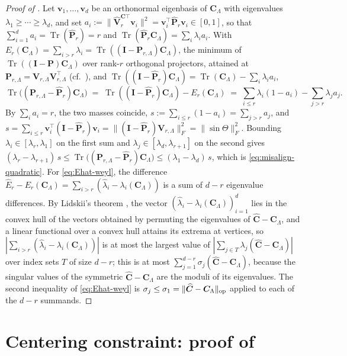 \documentclass[review,hidelinks,onefignum,onetabnum]{siamart251216}
\newcommand{\tr}{\operatorname{Tr}}
\newcommand{\mC}{\bm{C}}
\newcommand{\hmC}{\widehat{\bm{C}}}
\newcommand{\mV}{\bm{V}}
\newcommand{\hmV}{\widehat{\bm{V}}}
\newcommand{\mP}{\bm{P}}
\newcommand{\hmP}{\widehat{\bm{P}}}
\newcommand{\mI}{\bm{I}}
\newcommand{\vv}{\bm{v}}
\begin{document}
\begin{proof}[Proof of ]
Let $\vv_1,\dots,\vv_d$ be an orthonormal eigenbasis of $\mC_\Lambda$ with eigenvalues $\lambda_1\ge\cdots\ge\lambda_d$, and set $a_i := \|\hmV_r^{\mC\top}\vv_i\|^2 = \vv_i^\top\hmP_r\vv_i \in [0,1]$, so that $\sum_{i=1}^d a_i = \tr(\hmP_r) = r$ and $\tr(\hmP_r\mC_\Lambda) = \sum_i\lambda_i a_i$. With $E_r(\mC_\Lambda) = \sum_{i>r}\lambda_i = \tr((\mI-\mP_{r,\Lambda})\mC_\Lambda)$, the minimum of $\tr((\mI-\mP)\mC_\Lambda)$ over rank-$r$ orthogonal projectors, attained at $\mP_{r,\Lambda} = \mV_{r,\Lambda}\mV_{r,\Lambda}^\top$ (cf.\ \cite[Prob.~III.6.11]{Bhatia1997}), and $\tr((\mI-\hmP_r)\mC_\Lambda) = \tr(\mC_\Lambda) - \sum_i\lambda_i a_i$,
\[
  \tr\bigl((\mP_{r,\Lambda}-\hmP_r)\mC_\Lambda\bigr) \;=\; \tr((\mI-\hmP_r)\mC_\Lambda) - E_r(\mC_\Lambda) \;=\; \sum_{i\le r}\lambda_i(1-a_i) - \sum_{j>r}\lambda_j a_j.
\]
By $\sum_i a_i = r$, the two masses coincide, $s := \sum_{i\le r}(1-a_i) = \sum_{j>r}a_j$, and $s = \sum_{i\le r}\vv_i^\top(\mI-\hmP_r)\vv_i = \|(\mI-\hmP_r)\mV_{r,\Lambda}\|_F^2 = \|\sin\Theta\|_F^2$. Bounding $\lambda_i\in[\lambda_r,\lambda_1]$ on the first sum and $\lambda_j\in[\lambda_d,\lambda_{r+1}]$ on the second gives $(\lambda_r-\lambda_{r+1})\,s \le \tr\bigl((\mP_{r,\Lambda}-\hmP_r)\mC_\Lambda\bigr) \le (\lambda_1-\lambda_d)\,s$, which is \eqref{eq:misalign-quadratic}. For \eqref{eq:Ehat-weyl}, the difference $\widehat E_r - E_r(\mC_\Lambda) = \sum_{i>r}(\widehat\lambda_i - \lambda_i(\mC_\Lambda))$ is a sum of $d-r$ eigenvalue differences. By Lidskii's theorem \cite[Ex.~III.4.3]{Bhatia1997}, the vector $(\widehat\lambda_i - \lambda_i(\mC_\Lambda))_{i=1}^d$ lies in the convex hull of the vectors obtained by permuting the eigenvalues of $\hmC - \mC_\Lambda$, and a linear functional over a convex hull attains its extrema at vertices, so $|\sum_{i>r}(\widehat\lambda_i - \lambda_i(\mC_\Lambda))|$ is at most the largest value of $|\sum_{j\in T}\lambda_j(\hmC-\mC_\Lambda)|$ over index sets $T$ of size $d-r$; this is at most $\sum_{j=1}^{d-r}\sigma_j(\hmC-\mC_\Lambda)$, because the singular values of the symmetric $\hmC-\mC_\Lambda$ are the moduli of its eigenvalues. The second inequality of \eqref{eq:Ehat-weyl} is $\sigma_j \le \sigma_1 = \|\hmC-\mC_\Lambda\|_{\rm op}$ applied to each of the $d-r$ summands.
\end{proof}

\section{Centering constraint: proof of }
\label{app:centering}
\end{document}
